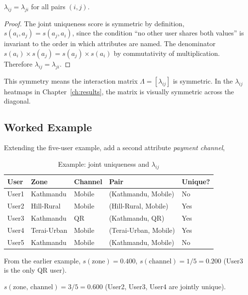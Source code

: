 \begin{proposition}
$\lambda_{ij} = \lambda_{ji}$ for all pairs $(i, j)$.
\end{proposition}

\begin{proof}
The joint uniqueness score is symmetric by definition,
$s(a_i, a_j) = s(a_j, a_i)$, since the condition
``no other user shares both values'' is invariant to
the order in which attributes are named. The denominator
$s(a_i) \times s(a_j) = s(a_j) \times s(a_i)$ by
commutativity of multiplication. Therefore
$\lambda_{ij} = \lambda_{ji}$.
\end{proof}

This symmetry means the interaction matrix
$\Lambda = [\lambda_{ij}]$ is symmetric. In the
$\lambda_{ij}$ heatmaps in Chapter~\ref{ch:results},
the matrix is visually symmetric across the diagonal.

\subsection{Worked Example}

Extending the five-user example, add a second attribute
\textit{payment channel},

\begin{table}[H]
\centering
\caption{Example: joint uniqueness and $\lambda_{ij}$}
\label{tab:lambda_example}
\begin{tabular}{lllll}
\toprule
\textbf{User} & \textbf{Zone} & \textbf{Channel} &
\textbf{Pair} & \textbf{Unique?} \\
\midrule
User1 & Kathmandu       & Mobile & (Kathmandu, Mobile)   & No \\
User2 & Hill-Rural     & Mobile & (Hill-Rural, Mobile)  & Yes \\
User3 & Kathmandu       & QR     & (Kathmandu, QR)        & Yes \\
User4 & Terai-Urban    & Mobile & (Terai-Urban, Mobile) & Yes \\
User5 & Kathmandu       & Mobile & (Kathmandu, Mobile)   & No \\
\bottomrule
\end{tabular}
\end{table}

From the earlier example, $s(\text{zone}) = 0.400$,
$s(\text{channel}) = 1/5 = 0.200$ (User3 is the only
QR user).

$s(\text{zone, channel}) = 3/5 = 0.600$
(User2, User3, User4 are jointly unique).

